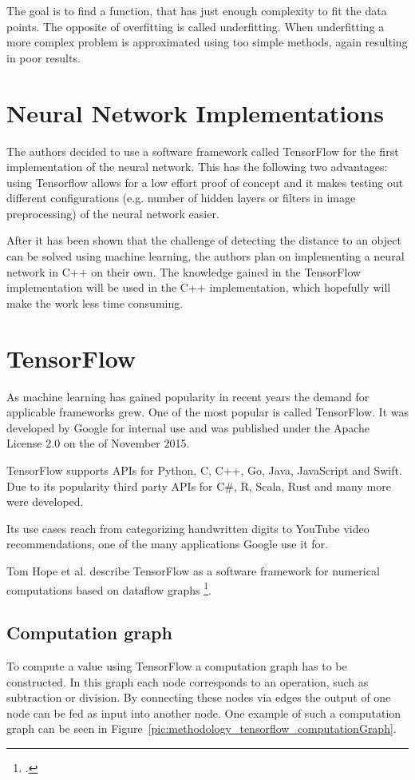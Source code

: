 The goal is to find a function, that has just enough complexity to fit the data points. The opposite of overfitting is called underfitting. When underfitting a more complex problem is approximated using too simple methods, again resulting in poor results.

\section{Neural Network Implementations}
The authors decided to use a software framework called TensorFlow for the first implementation of the neural network. This has the following two advantages: using Tensorflow allows for a low effort proof of concept and it makes testing out different configurations (e.g. number of hidden layers or filters in image preprocessing) of the neural network easier.

After it has been shown that the challenge of detecting the distance to an object can be solved using machine learning, the authors plan on implementing a neural network in C++ on their own. The knowledge gained in the TensorFlow implementation will be used in the C++ implementation, which hopefully will make the work less time consuming.

\section{TensorFlow}
As machine learning has gained popularity in recent years the demand for applicable frameworks grew. One of the most popular is called TensorFlow. It was developed by Google for internal use and was published under the Apache License 2.0 on the  of November 2015.

TensorFlow supports APIs for Python, C, C++, Go, Java, JavaScript and Swift.
Due to its popularity third party APIs for C\#, R, Scala, Rust and many more were developed.

Its use cases reach from categorizing handwritten digits to YouTube video recommendations, one of the many applications Google use it for.

Tom Hope et al. describe TensorFlow as a software framework for numerical computations based on dataflow graphs \footcite[page 6]{Hope_Learning_TensorFlow}.

\subsection{Computation graph}
To compute a value using TensorFlow a computation graph has to be constructed. In this graph each node corresponds to an operation, such as subtraction or division. By connecting these nodes via edges the output of one node can be fed as input into another node. One example of such a computation graph can be seen in Figure~\ref{pic:methodology_tensorflow_computationGraph}.


